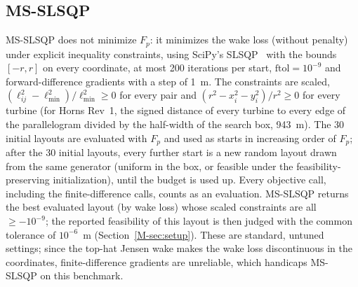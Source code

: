 \documentclass[10pt]{article}
\begin{document}
\subsection{MS-SLSQP}
\label{sec:S-slsqp}
MS-SLSQP does not minimize $F_p$: it minimizes the wake loss (without penalty) under explicit inequality constraints, using SciPy's SLSQP~\cite{Kraft1988} with the bounds $[-r,r]$ on every coordinate, at most 200 iterations per start, $\mathrm{ftol}=10^{-9}$ and forward-difference gradients with a step of 1~m. The constraints are scaled, $(\ell_{ij}^2-\ell_{\min}^2)/\ell_{\min}^2\ge0$ for every pair and $(r^2-x_i^2-y_i^2)/r^2\ge0$ for every turbine (for Horns Rev~1, the signed distance of every turbine to every edge of the parallelogram divided by the half-width of the search box, 943~m). The 30 initial layouts are evaluated with $F_p$ and used as starts in increasing order of $F_p$; after the 30 initial layouts, every further start is a new random layout drawn from the same generator (uniform in the box, or feasible under the feasibility-preserving initialization), until the budget is used up. Every objective call, including the finite-difference calls, counts as an evaluation. MS-SLSQP returns the best evaluated layout (by wake loss) whose scaled constraints are all $\ge-10^{-9}$; the reported feasibility of this layout is then judged with the common tolerance of $10^{-6}$~m (Section~\ref{M-sec:setup}). These are standard, untuned settings; since the top-hat Jensen wake makes the wake loss discontinuous in the coordinates, finite-difference gradients are unreliable, which handicaps MS-SLSQP on this benchmark.
\end{document}
